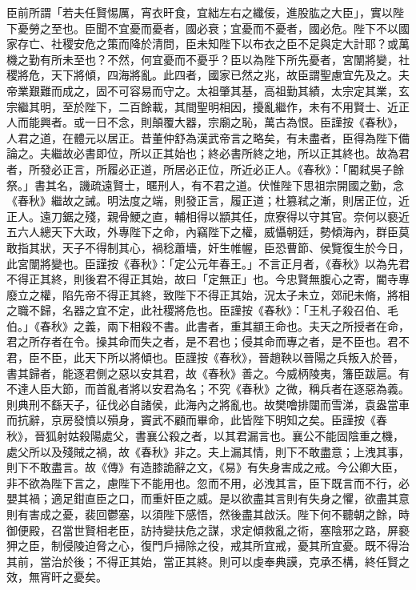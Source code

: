 \begin{pinyinscope}
 臣前所謂「若夫任賢惕厲，宵衣旰食，宜絀左右之纖佞，進股肱之大臣」，實以陛下憂勞之至也。臣聞不宜憂而憂者，國必衰；宜憂而不憂者，國必危。陛下不以國家存亡、社稷安危之策而降於清問，臣未知陛下以布衣之臣不足與定大計耶？或萬機之勤有所未至也？不然，何宜憂而不憂乎？臣以為陛下所先憂者，宮闈將變，社稷將危，天下將傾，四海將亂。此四者，國家已然之兆，故臣謂聖慮宜先及之。夫帝業艱難而成之，固不可容易而守之。太祖肇其基，高祖勤其績，太宗定其業，玄宗繼其明，至於陛下，二百餘載，其間聖明相因，擾亂繼作，未有不用賢士、近正人而能興者。或一日不念，則顛覆大器，宗廟之恥，萬古為恨。臣謹按《春秋》，人君之道，在體元以居正。昔董仲舒為漢武帝言之略矣，有未盡者，臣得為陛下備論之。夫繼故必書即位，所以正其始也；終必書所終之地，所以正其終也。故為君者，所發必正言，所履必正道，所居必正位，所近必正人。《春秋》：「閽弒吳子餘祭。」書其名，譏疏遠賢士，暱刑人，有不君之道。伏惟陛下思祖宗開國之勤，念《春秋》繼故之誡。明法度之端，則發正言，履正道；杜篡弒之漸，則居正位，近正人。遠刀鋸之殘，親骨鯁之直，輔相得以顓其任，庶寮得以守其官。奈何以褻近五六人總天下大政，外專陛下之命，內竊陛下之權，威懾朝廷，勢傾海內，群臣莫敢指其狀，天子不得制其心，禍稔蕭墻，奸生帷幄，臣恐曹節、侯覽復生於今日，此宮闈將變也。臣謹按《春秋》：「定公元年春王。」不言正月者，《春秋》以為先君不得正其終，則後君不得正其始，故曰「定無正」也。今忠賢無腹心之寄，閽寺專廢立之權，陷先帝不得正其終，致陛下不得正其始，況太子未立，郊祀未脩，將相之職不歸，名器之宜不定，此社稷將危也。臣謹按《春秋》：「王札子殺召伯、毛伯。」《春秋》之義，兩下相殺不書。此書者，重其顓王命也。夫天之所授者在命，君之所存者在令。操其命而失之者，是不君也；侵其命而專之者，是不臣也。君不君，臣不臣，此天下所以將傾也。臣謹按《春秋》，晉趙鞅以晉陽之兵叛入於晉，書其歸者，能逐君側之惡以安其君，故《春秋》善之。今威柄陵夷，籓臣跋扈。有不達人臣大節，而首亂者將以安君為名；不究《春秋》之微，稱兵者在逐惡為義。則典刑不繇天子，征伐必自諸侯，此海內之將亂也。故樊噲排闥而雪涕，袁盎當車而抗辭，京房發憤以殞身，竇武不顧而畢命，此皆陛下明知之矣。臣謹按《春秋》，晉狐射姑殺陽處父，書襄公殺之者，以其君漏言也。襄公不能固陰重之機，處父所以及殘賊之禍，故《春秋》非之。夫上漏其情，則下不敢盡意；上洩其事，則下不敢盡言。故《傳》有造膝詭辭之文，《易》有失身害成之戒。今公卿大臣，非不欲為陛下言之，慮陛下不能用也。忽而不用，必洩其言，臣下既言而不行，必嬰其禍；適足鉗直臣之口，而重奸臣之威。是以欲盡其言則有失身之懼，欲盡其意則有害成之憂，裴回鬱塞，以須陛下感悟，然後盡其啟沃。陛下何不聽朝之餘，時御便殿，召當世賢相老臣，訪持變扶危之謀，求定傾救亂之術，塞陰邪之路，屏褻狎之臣，制侵陵迫脅之心，復門戶掃除之役，戒其所宜戒，憂其所宜憂。既不得治其前，當治於後；不得正其始，當正其終。則可以虔奉典謨，克承丕構，終任賢之效，無宵旰之憂矣。




\end{pinyinscope}
